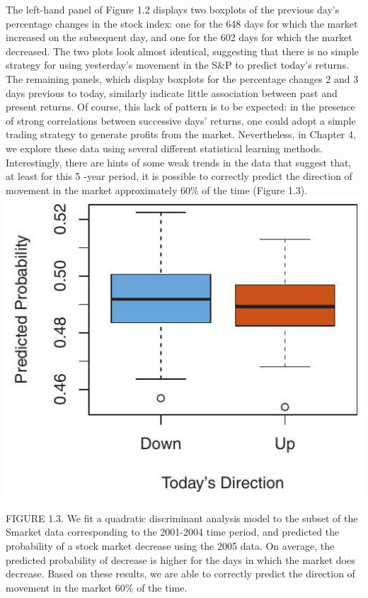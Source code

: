 \documentclass[10pt]{article}
\begin{document}
The left-hand panel of Figure 1.2 displays two boxplots of the previous day's percentage changes in the stock index: one for the 648 days for which the market increased on the subsequent day, and one for the 602 days for which the market decreased. The two plots look almost identical, suggesting that there is no simple strategy for using yesterday's movement in the S\&P to predict today's returns. The remaining panels, which display boxplots for the percentage changes 2 and 3 days previous to today, similarly indicate little association between past and present returns. Of course, this lack of pattern is to be expected: in the presence of strong correlations between successive days' returns, one could adopt a simple trading strategy to generate profits from the market. Nevertheless, in Chapter 4, we explore these data using several different statistical learning methods. Interestingly, there are hints of some weak trends in the data that suggest that, at least for this 5 -year period, it is possible to correctly predict the direction of movement in the market approximately $60 \%$ of the time (Figure 1.3).\\
\includegraphics[max width=\textwidth, center]{2025_05_05_efe77898333945044de4g-019}

FIGURE 1.3. We fit a quadratic discriminant analysis model to the subset of the Smarket data corresponding to the 2001-2004 time period, and predicted the probability of a stock market decrease using the 2005 data. On average, the predicted probability of decrease is higher for the days in which the market does decrease. Based on these results, we are able to correctly predict the direction of movement in the market $60 \%$ of the time.
\end{document}
